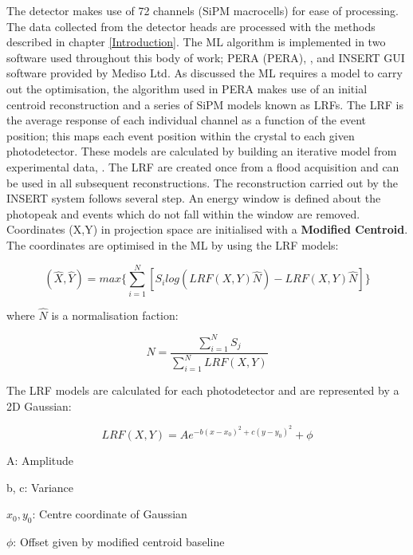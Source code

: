 The detector makes use of 72 channels (\acrshort{SiPM} macrocells) for ease of processing. The data collected from the detector heads are processed with the methods described in chapter \ref{Introduction}. The \acrshort{ML} algorithm is implemented in two software used throughout this body of work; \acrshort{PERA} (\acrlong{PERA}), \cite{OCCHIPINTI2015DevelopmentImaging}, and INSERT GUI software provided by Mediso Ltd. As discussed the \acrshort{ML} requires a model to carry out the optimisation, the algorithm used in \acrshort{PERA} makes use of an initial centroid reconstruction and a series of \acrshort{SiPM} models known as \acrlong{LRF}s. The \acrshort{LRF} is the average response of each individual channel as a function of the event position; this maps each event position within the crystal to each given photodetector. These models are calculated by building an iterative model from experimental data, \cite{Morozov_2017} \cite{8069405}. The \acrshort{LRF} are created once from a flood acquisition and can be used in all subsequent reconstructions. The reconstruction carried out by the \acrshort{INSERT} system follows several step. An energy window is defined about the photopeak and events which do not fall within the window are removed. Coordinates (X,Y) in projection space are initialised with a \textbf{Modified Centroid}. The coordinates are optimised in the \acrshort{ML} by using the \acrshort{LRF} models: 

\begin{equation} \label{eqn:PERA}
                (\hat{X},\hat{Y}) = max\{ \sum^{N}_{i=1} [ S_{i}log(LRF(X,Y) \hat{N}) - LRF(X,Y) \hat{N} ] \}
\end{equation}

where $\hat{N}$ is a normalisation faction:

\begin{equation} \label{eqn:Norm}
                \hat{N} = \frac{\sum^{N}_{i=1} S_{j}}{\sum^{N}_{i=1} LRF(X,Y)}
\end{equation}

The \acrshort{LRF} models are calculated for each photodetector and are represented by a 2D Gaussian: 

\begin{equation} \label{eqn:LRF}
    LRF(X,Y) = Ae^{-b(x-x_{0})^{2} + c(y-y_{0})^2} + \phi
\end{equation}

\begin{description}
    \item{A}: Amplitude
    \vspace{-0.5cm}
    \item{b, c}: Variance
    \vspace{-0.5cm}
    \item{$x_{0}, y_{0}$}: Centre coordinate of Gaussian
   \vspace{-0.5cm}
    \item{$\phi$}: Offset given by modified centroid baseline
\end{description}

